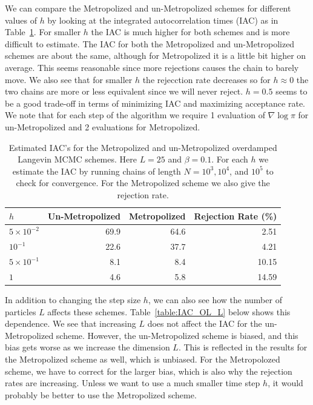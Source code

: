 \documentclass[11pt,a4paper]{amsart}
\begin{document}
\par We can compare the Metropolized and un-Metropolized schemes for different values of $h$ by looking at the integrated autocorrelation times (IAC) as in Table~\ref{table:IAC_OL}.  For smaller $h$ the IAC is much higher for both schemes and is more difficult to estimate.  The IAC for both the Metropolized and un-Metropolized schemes are about the same, although for Metropolized it is a little bit higher on average.  This seems reasonable since more rejections causes the chain to barely move.  We also see that for smaller $h$ the rejecction rate decreases so for $h\approx 0$ the two chains are more or less equivalent since we will never reject.  $h = 0.5$ seems to be a good trade-off in terms of minimizing IAC and maximizing acceptance rate.  We note that for each step of the algorithm we require 1 evaluation of $\nabla \log \pi$ for un-Metropolized and 2 evaluations for Metropolized.\\


\begin{table}[H]
\centering
\begin{tabular}{l | r r r}
$h$ & Un-Metropolized & Metropolized & Rejection Rate (\%) \\
\hline
$5 \times 10^{-2}$ & 69.9 & 64.6 & 2.51\\
$10^{-1}$ & 22.6 & 37.7 & 4.21 \\
$5\times 10^{-1}$ & 8.1 & 8.4 & 10.15 \\
$1$ & 4.6 & 5.8 & 14.59
\end{tabular}
\caption{Estimated IAC's for the Metropolized and un-Metropolized overdamped Langevin MCMC schemes.  Here $L=25$ and $\beta=0.1$.  For each $h$ we estimate the IAC by running chains of length $N = 10^3,10^4$, and $10^5$ to check for convergence.  For the Metropolized scheme we also give the rejection rate.}
\label{table:IAC_OL}
\end{table}

\par In addition to changing the step size $h$, we can also see how the number of particles $L$ affects these schemes.  Table~\ref{table:IAC_OL_L} below shows this dependence.  We see that increasing $L$ does not affect the IAC for the un-Metropolized scheme.  However, the un-Metropolized scheme is biased, and this bias gets worse as we increase the dimension $L$.  This is reflected in the results for the Metropolized scheme as well, which is unbiased.  For the Metropolozed scheme, we have to correct for the larger bias, which is also why the rejection rates are increasing.  Unless we want to use a much smaller time step $h$, it would probably be better to use the Metropolized scheme.
\end{document}
